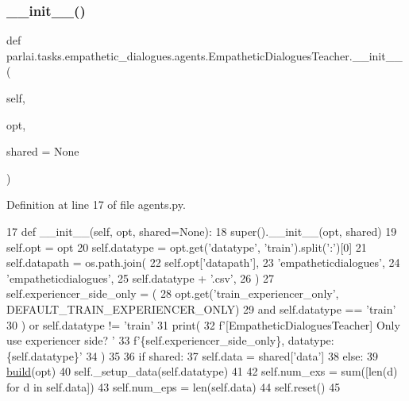 \subsubsection{\texorpdfstring{\+\_\+\+\_\+init\+\_\+\+\_\+()}{\_\_init\_\_()}}
{\footnotesize\ttfamily def parlai.\+tasks.\+empathetic\+\_\+dialogues.\+agents.\+Empathetic\+Dialogues\+Teacher.\+\_\+\+\_\+init\+\_\+\+\_\+ (\begin{DoxyParamCaption}\item[{}]{self,  }\item[{}]{opt,  }\item[{}]{shared = {\ttfamily None} }\end{DoxyParamCaption})}



Definition at line 17 of file agents.\+py.


\begin{DoxyCode}
17     \textcolor{keyword}{def }\_\_init\_\_(self, opt, shared=None):
18         super().\_\_init\_\_(opt, shared)
19         self.opt = opt
20         self.datatype = opt.get(\textcolor{stringliteral}{'datatype'}, \textcolor{stringliteral}{'train'}).split(\textcolor{stringliteral}{':'})[0]
21         self.datapath = os.path.join(
22             self.opt[\textcolor{stringliteral}{'datapath'}],
23             \textcolor{stringliteral}{'empatheticdialogues'},
24             \textcolor{stringliteral}{'empatheticdialogues'},
25             self.datatype + \textcolor{stringliteral}{'.csv'},
26         )
27         self.experiencer\_side\_only = (
28             opt.get(\textcolor{stringliteral}{'train\_experiencer\_only'}, DEFAULT\_TRAIN\_EXPERIENCER\_ONLY)
29             \textcolor{keywordflow}{and} self.datatype == \textcolor{stringliteral}{'train'}
30         ) \textcolor{keywordflow}{or} self.datatype != \textcolor{stringliteral}{'train'}
31         print(
32             f\textcolor{stringliteral}{'[EmpatheticDialoguesTeacher] Only use experiencer side? '}
33             f\textcolor{stringliteral}{'\{self.experiencer\_side\_only\}, datatype: \{self.datatype\}'}
34         )
35 
36         \textcolor{keywordflow}{if} shared:
37             self.data = shared[\textcolor{stringliteral}{'data'}]
38         \textcolor{keywordflow}{else}:
39             \hyperlink{namespaceparlai_1_1mturk_1_1tasks_1_1talkthewalk_1_1download_a8c0fbb9b6dfe127cb8c1bd6e7c4e33fd}{build}(opt)
40             self.\_setup\_data(self.datatype)
41 
42         self.num\_exs = sum([len(d) \textcolor{keywordflow}{for} d \textcolor{keywordflow}{in} self.data])
43         self.num\_eps = len(self.data)
44         self.reset()
45 
\end{DoxyCode}


